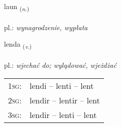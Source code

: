 \documentclass[frontgrid, backgrid]{flacards}\usepackage[]{graphicx}\usepackage[]{xcolor}
\begin{document}
\renewcommand{\flhead}{\vskip5pt \fboxsep=0pt {\small\bfseries\footnotesize Nafnorð | Noun}}
\renewcommand{\fcfoot}{\vskip5pt \fboxsep=0pt \hspace{2pt}{\small\bfseries\footnotesize 1K}}

\renewcommand{\blhead}{\vskip5pt {\small\bfseries\footnotesize Nafnorð | Noun }}
\renewcommand{\bcfoot}{\vskip5pt \hspace{2pt}{\small\bfseries\footnotesize 1K}}


{laun \small{\textsubscript{(\textit{n.})}} \\[1ex] %
\textphonetic{[lœiːn]} \\
pl.: \emph{wynagrodzenie, wypłata} \\  [2ex]
\renewcommand*{\arraystretch}{0.8}
}

\renewcommand{\flhead}{\vskip5pt \fboxsep=0pt {\small\bfseries\footnotesize Sagnorð | Verb}}
\renewcommand{\fcfoot}{\vskip5pt \fboxsep=0pt \hspace{2pt}{\small\bfseries\footnotesize 1K}}

\renewcommand{\blhead}{\vskip5pt {\small\bfseries\footnotesize Sagnorð | Verb }}
\renewcommand{\bcfoot}{\vskip5pt \hspace{2pt}{\small\bfseries\footnotesize 1K}}


{lenda \small{\textsubscript{(\textit{v.})}} \\[1ex] %
\textphonetic{[lɛnta]} \\
pl.: \emph{wjechać do; wylądować, wjeżdżać} \\  [2ex]
\renewcommand*{\arraystretch}{0.8}
\begin{tabular}{p{1cm}l}
\textsc{1sg}: & lendi -- lenti -- lent \\ 
\textsc{2sg}: & lendir -- lentir -- lent \\ 
\textsc{3sg}: & lendir -- lenti -- lent \\ 
\end{tabular}
}
\end{document}

